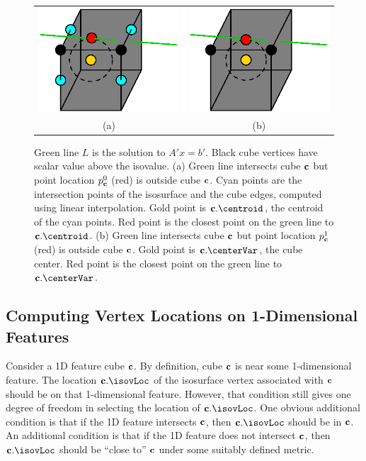 \begin{figure}[t]
\centering

\begin{tabular}{cc}
\includegraphics[width=0.4\linewidth]{images/centroid.eps} \qquad &
\qquad
\includegraphics[width=0.4\linewidth]{images/center.eps} \\
(a) & (b)
\end{tabular}

\caption{Green line $L$ is the solution to $A'x = b'$.
Black cube vertices have scalar value above the isovalue.
(a) Green line intersects cube $\mathbf{c}$
but point location $p^0_{\mathbf{c}}$ (red) is outside cube $\mathbf{c}$.
Cyan points are the intersection points of the isosurface
and the cube edges, computed using linear interpolation.
Gold point is $\cb.\protect\centroid$, the centroid of the cyan points.
Red point is the closest point on the green line to $\cb.\protect\centroid$.
(b) Green line intersects cube $\mathbf{c}$
but point location $p^1_{\mathbf{c}}$ (red) is outside cube $\mathbf{c}$.
Gold point is $\cb.\protect\centerVar$, the cube center.
Red point is the closest point on the green line to $\cb.\protect\centerVar$.
}
\label{fig:out_of_cube}
\end{figure}

\subsection{Computing Vertex Locations on 1-Dimensional Features}

Consider a 1D feature cube $\mathbf{c}$.
By definition, cube $\mathbf{c}$ is near some 1-dimensional feature.
The location $\cb.\isovLoc$ of the isosurface vertex associated with $\mathbf{c}$ 
should be on that 1-dimensional feature.
However, that condition still gives one degree of freedom in selecting
the location of $\cb.\isovLoc$.
One obvious additional condition is that if the 1D feature intersects $\mathbf{c}$,
then $\cb.\isovLoc$ should be in $\mathbf{c}$.
An additional condition is that if the 1D feature does not intersect $\mathbf{c}$,
then $\cb.\isovLoc$ should be ``close to'' $\mathbf{c}$ 
under some suitably defined metric.

